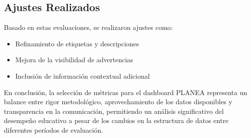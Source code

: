 \subsection{Ajustes Realizados}
Basado en estas evaluaciones, se realizaron ajustes como:

\begin{itemize}
    \item Refinamiento de etiquetas y descripciones
    \item Mejora de la visibilidad de advertencias
    \item Inclusión de información contextual adicional
\end{itemize}

En conclusión, la selección de métricas para el dashboard PLANEA representa un balance entre rigor metodológico, aprovechamiento de los datos disponibles y transparencia en la comunicación, permitiendo un análisis significativo del desempeño educativo a pesar de los cambios en la estructura de datos entre diferentes períodos de evaluación.
